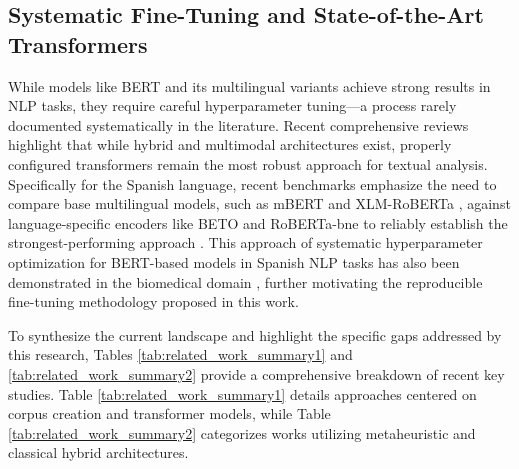 \documentclass[informatics,article,submit,pdftex,moreauthors]{Definitions/mdpi}
\begin{document}
\subsection{Systematic Fine-Tuning and State-of-the-Art Transformers}
While models like BERT and its multilingual variants achieve strong results in NLP tasks, they require careful hyperparameter tuning—a process rarely documented systematically in the literature. Recent comprehensive reviews \citep{singh2024comprehensive, alghamdi2024comprehensive} highlight that while hybrid and multimodal architectures exist, properly configured transformers \citep{rout2025reliable} remain the most robust approach for textual analysis. Specifically for the Spanish language, recent benchmarks emphasize the need to compare base multilingual models, such as mBERT \citep{devlin2018bert} and XLM-RoBERTa \citep{conneau2019unsupervised}, against language-specific encoders like BETO \citep{canete2020spanish} and RoBERTa-bne \citep{gutierrez2022roberta} to reliably establish the strongest-performing approach \citep{blanco2024enhancing}. This approach of systematic hyperparameter optimization for BERT-based models in Spanish NLP tasks has also been demonstrated in the biomedical domain \citep{padilla2024medicobert}, further motivating the reproducible fine-tuning methodology proposed in this work.

To synthesize the current landscape and highlight the specific gaps addressed by this research, Tables \ref{tab:related_work_summary1} and \ref{tab:related_work_summary2} provide a comprehensive breakdown of recent key studies. Table \ref{tab:related_work_summary1} details approaches centered on corpus creation and transformer models, while Table \ref{tab:related_work_summary2} categorizes works utilizing metaheuristic and classical hybrid architectures.
\end{document}
